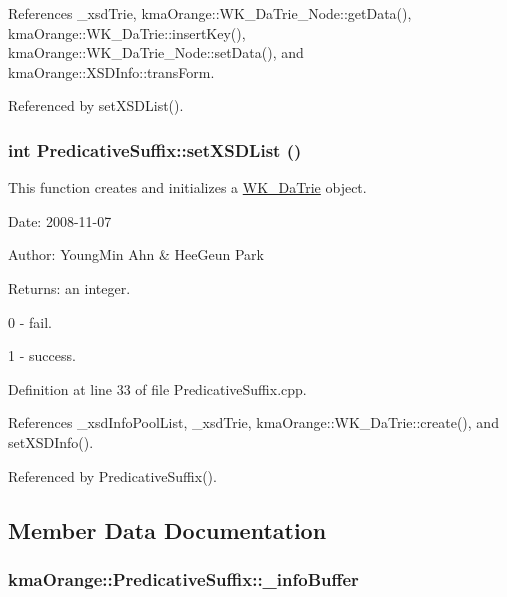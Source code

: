 References \_\-xsdTrie, kmaOrange::WK\_\-DaTrie\_\-Node::getData(), kmaOrange::WK\_\-DaTrie::insertKey(), kmaOrange::WK\_\-DaTrie\_\-Node::setData(), and kmaOrange::XSDInfo::transForm.

Referenced by setXSDList().\hypertarget{classkmaOrange_1_1PredicativeSuffix_03b3bc03d1f07f20cfa2167ff89dba0a}{
\subsubsection[{setXSDList}]{\setlength{\rightskip}{0pt plus 5cm}int PredicativeSuffix::setXSDList ()}}
\label{classkmaOrange_1_1PredicativeSuffix_03b3bc03d1f07f20cfa2167ff89dba0a}


This function creates and initializes a \hyperlink{classkmaOrange_1_1WK__DaTrie}{WK\_\-DaTrie} object. 

\begin{Desc}
\item[Date:]2008-11-07 \end{Desc}
\begin{Desc}
\item[Author:]YoungMin Ahn \& HeeGeun Park \end{Desc}
\begin{Desc}
\item[Returns:]an integer.\par
 0 - fail.\par
 1 - success. \end{Desc}


Definition at line 33 of file PredicativeSuffix.cpp.

References \_\-xsdInfoPoolList, \_\-xsdTrie, kmaOrange::WK\_\-DaTrie::create(), and setXSDInfo().

Referenced by PredicativeSuffix().

\subsection{Member Data Documentation}
\hypertarget{classkmaOrange_1_1PredicativeSuffix_0f9606b85a92a39e666c05d41b6454ea}{
\subsubsection[{\_\-infoBuffer}]{ {\bf kmaOrange::PredicativeSuffix::\_\-infoBuffer}}}
\label{classkmaOrange_1_1PredicativeSuffix_0f9606b85a92a39e666c05d41b6454ea}


